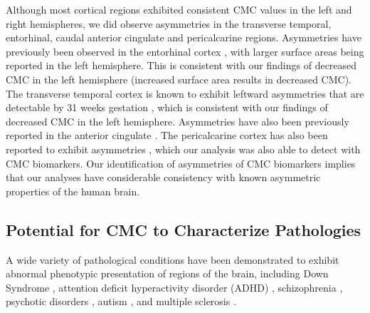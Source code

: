 \documentclass{article}
\begin{document}
Although most cortical regions exhibited consistent CMC values in the left
and right hemispheres, we did observe asymmetries in the transverse temporal,
entorhinal, caudal anterior cingulate and pericalcarine regions. Asymmetries
have previously been observed in the entorhinal cortex
\citep{simicHemisphericAsymmetryModular2005}, with larger surface areas being
reported in the left hemisphere. This is consistent with our findings of
decreased CMC in the left hemisphere (increased surface area results in
decreased CMC). The transverse temporal cortex is known to exhibit leftward
asymmetries that are detectable by 31 weeks gestation
\citep{chiLeftRightAsymmetriesTemporal1977}, which is consistent with our
findings of decreased CMC in the left hemisphere. Asymmetries have also been
previously reported in the anterior cingulate
\citep{yanHemisphericAsymmetryCognitive2009}. The pericalcarine cortex has
also been reported to exhibit asymmetries
\citep{chiarelloStructuralAsymmetryHuman2016,koelkebeckContributionCorticalThickness2014},
which our analysis was also able to detect with CMC biomarkers. Our
identification of asymmetries of CMC biomarkers implies that our analyses
have considerable consistency with known asymmetric properties of the human
brain.

\subsection{Potential for CMC to Characterize Pathologies}

A wide variety of pathological conditions have been demonstrated to exhibit
abnormal phenotypic presentation of regions of the brain, including Down
Syndrome \citep{levmanStructuralMagneticResonance2019}, attention deficit
hyperactivity disorder (ADHD)
\citep{listonAtypicalPrefrontalConnectivity2011,stanleyEvidenceDevelopmentalAlterations2008,levmanCorticalThicknessAbnormalities2022},
schizophrenia \citep{innocentiSchizophreniaNeurodevelopmentCorpus2003,keshavanSchizophreniaDueExcessive1994,feinbergCorticalPruningDevelopment1990,hoffmanCorticalPruningDevelopment1989,rimolCorticalThicknessSubcortical2010,narrMappingCorticalThickness2005,venkatasubramanianAutomatedMRIParcellation2008,vanharenChangesCorticalThickness2011,schultzReducedCorticalThickness2010,nesvagRegionalThinningCerebral2008,seitzAlterationGrayMatter2018,qiuHippocampalcorticalStructuralConnectivity2010,johnsonHippocampalShapeAbnormalities2013,mackinleyDeviantCorticalSulcation2020,levmanMorphologicalStudySchizophrenia2022},
psychotic disorders \citep{bakkerCorticalMorphologyDifferences2016}, autism
\citep{khundrakpamCorticalThicknessAbnormalities2017,pereiraDifferencesCorticalStructure2018,zielinskiLongitudinalChangesCortical2014,levmanStructuralMagneticResonance2019,levmanClinicallyDetectableStructural2021},
and multiple sclerosis
\citep{brexLongitudinalStudyAbnormalities2002,losseffProgressiveCerebralAtrophy1996,chenRelatingNeocorticalPathology2004,sailerFocalThinningCerebral2003,levmanClinicallyDetectableStructural2021}.
\end{document}
